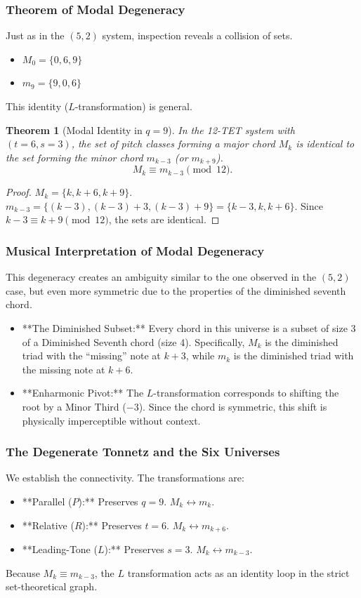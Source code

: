 \documentclass[12pt,letterpaper]{amsart}
\newtheorem{theorem}{Theorem}
\begin{document}
\subsubsection{Theorem of Modal Degeneracy}
Just as in the $(5,2)$ system, inspection reveals a collision of sets.
\begin{itemize}
    \item $M_0 = \{0, 6, 9\}$
    \item $m_9 = \{9, 0, 6\}$
\end{itemize}
This identity ($L$-transformation) is general.

\begin{theorem}[Modal Identity in $q=9$]
In the 12-TET system with $(t=6, s=3)$, the set of pitch classes forming a major chord $M_k$ is identical to the set forming the minor chord $m_{k-3}$ (or $m_{k+9}$).
\[ M_k \equiv m_{k-3} \pmod{12}. \]
\end{theorem}

\begin{proof}
$M_k = \{k, k+6, k+9\}$.
$m_{k-3} = \{(k-3), (k-3)+3, (k-3)+9\} = \{k-3, k, k+6\}$.
Since $k-3 \equiv k+9 \pmod{12}$, the sets are identical.
\end{proof}

\subsubsection{Musical Interpretation of Modal Degeneracy}
This degeneracy creates an ambiguity similar to the one observed in the $(5,2)$ case, but even more symmetric due to the properties of the diminished seventh chord.
\begin{itemize}
    \item **The Diminished Subset:** Every chord in this universe is a subset of size 3 of a Diminished Seventh chord (size 4). Specifically, $M_k$ is the diminished triad with the ``missing'' note at $k+3$, while $m_k$ is the diminished triad with the missing note at $k+6$.
    \item **Enharmonic Pivot:** The $L$-transformation corresponds to shifting the root by a Minor Third ($-3$). Since the chord is symmetric, this shift is physically imperceptible without context.
\end{itemize}

\subsubsection{The Degenerate Tonnetz and the Six Universes}
We establish the connectivity. The transformations are:
\begin{itemize}
    \item **Parallel ($P$):** Preserves $q=9$. $M_k \leftrightarrow m_k$.
    \item **Relative ($R$):** Preserves $t=6$. $M_k \leftrightarrow m_{k+6}$.
    \item **Leading-Tone ($L$):** Preserves $s=3$. $M_k \leftrightarrow m_{k-3}$.
\end{itemize}
Because $M_k \equiv m_{k-3}$, the $L$ transformation acts as an identity loop in the strict set-theoretical graph.
\end{document}
